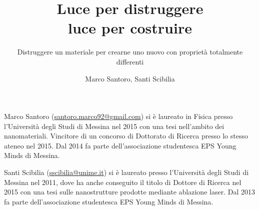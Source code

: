 ﻿\title{Luce per distruggere\\luce per costruire}
\subtitle{Distruggere un materiale per crearne uno nuovo con proprietà totalmente differenti}
\suptitle{}
\author{Marco Santoro, Santi Scibilia}
\maketitle
\begin{small}
\pichskip{4mm}
\nobalance



\vfill
\begin{thebiography}{}%
Marco Santoro (\url{santoro.marco92@gmail.com}) si è laureato in Fisica presso
l'Università degli Studi di Messina nel 2015 con una tesi nell'ambito dei nanomateriali.
Vincitore di un concorso di Dottorato di Ricerca presso lo stesso ateneo nel 2015.
Dal 2014 fa parte dell'associazione studentesca EPS Young Minds di Messina.

Santi Scibilia (\url{sscibilia@unime.it}) si è laureato presso l'Università degli Studi di Messina nel 2011, dove ha anche conseguito il titolo di Dottore di Ricerca nel 2015 con una tesi sulle nanostrutture prodotte mediante ablazione laser. Dal 2013 fa parte dell'associazione studentesca EPS Young Minds di Messina.
\end{thebiography}
\end{small}

